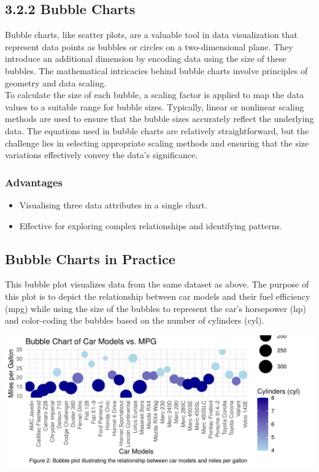 \documentclass{article}\usepackage[]{graphicx}\usepackage[]{xcolor}
\makeatletter
\def\maxwidth{ %
  \ifdim\Gin@nat@width>\linewidth
    \linewidth
  \else
    \Gin@nat@width
  \fi
}
\newenvironment{knitrout}{}{} %
\makeatother
\begin{document}
\subsection{3.2.2 Bubble Charts}
Bubble charts, like scatter plots, are a valuable tool in data visualization that represent data points as bubbles or circles on a two-dimensional plane. They introduce an additional dimension by encoding data using the size of these bubbles. The mathematical intricacies behind bubble charts involve principles of geometry and data scaling.\\
To calculate the size of each bubble, a scaling factor is applied to map the data values to a suitable range for bubble sizes. Typically, linear or nonlinear scaling methods are used to ensure that the bubble sizes accurately reflect the underlying data. The equations used in bubble charts are relatively straightforward, but the challenge lies in selecting appropriate scaling methods and ensuring that the size variations effectively convey the data's significance. 

\subsubsection{Advantages}
\begin{itemize}
    \item Visualising three data attributes in a single chart.
    \item Effective for exploring complex relationships and identifying patterns. 
\end{itemize}

\subsection{Bubble Charts in Practice}
 This bubble plot visualizes data from the same dataset as above. The purpose of this plot is to depict the relationship between car models and their fuel efficiency (mpg) while using the size of the bubbles to represent the car's horsepower (hp) and color-coding the bubbles based on the number of cylinders (cyl).

\begin{knitrout}
\color{fgcolor}
\includegraphics[width=\maxwidth]{figure/buble-plot-chunk-1} 
\end{knitrout}
\end{document}
